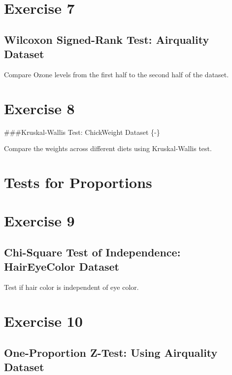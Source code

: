 \documentclass[
]{book}
\begin{document}
\section*{Exercise 7}\label{exercise-7}

\subsection*{Wilcoxon Signed-Rank Test: Airquality Dataset}\label{wilcoxon-signed-rank-test-airquality-dataset}

Compare Ozone levels from the first half to the second half of the dataset.

\section*{Exercise 8}\label{exercise-8}

\#\#\#Kruskal-Wallis Test: ChickWeight Dataset \{-\}

Compare the weights across different diets using Kruskal-Wallis test.

\section*{Tests for Proportions}\label{tests-for-proportions}

\section*{Exercise 9}\label{exercise-9}

\subsection{Chi-Square Test of Independence: HairEyeColor Dataset}\label{chi-square-test-of-independence-haireyecolor-dataset}

Test if hair color is independent of eye color.

\section*{Exercise 10}\label{exercise-10}

\subsection*{One-Proportion Z-Test: Using Airquality Dataset}\label{one-proportion-z-test-using-airquality-dataset}
\end{document}
